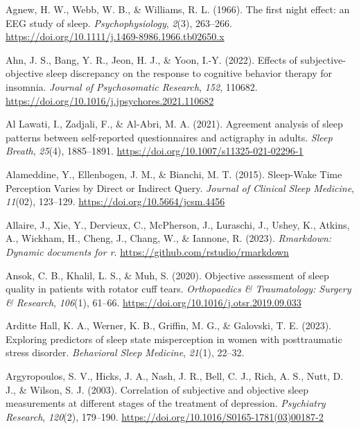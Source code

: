 \documentclass[
]{article}
\newlength{\cslhangindent}
\newenvironment{CSLReferences}[2] %
 {\begin{list}{}{%
  \setlength{\itemindent}{0pt}
  \setlength{\leftmargin}{0pt}
  \setlength{\parsep}{0pt}
  \ifodd #1
   \setlength{\leftmargin}{\cslhangindent}
   \setlength{\itemindent}{-1\cslhangindent}
  \fi
  \setlength{\itemsep}{#2\baselineskip}}}
 {\end{list}}
\begin{document}
\label{refs}
\begin{CSLReferences}{1}{0}
Agnew, H. W., Webb, W. B., \& Williams, R. L. (1966). {The first night effect: an EEG study of sleep.} \emph{Psychophysiology}, \emph{2}(3), 263--266. \url{https://doi.org/10.1111/j.1469-8986.1966.tb02650.x}

Ahn, J. S., Bang, Y. R., Jeon, H. J., \& Yoon, I.-Y. (2022). Effects of subjective-objective sleep discrepancy on the response to cognitive behavior therapy for insomnia. \emph{Journal of Psychosomatic Research}, \emph{152}, 110682. \url{https://doi.org/10.1016/j.jpsychores.2021.110682}

Al Lawati, I., Zadjali, F., \& Al-Abri, M. A. (2021). Agreement analysis of sleep patterns between self-reported questionnaires and actigraphy in adults. \emph{Sleep Breath}, \emph{25}(4), 1885--1891. \url{https://doi.org/10.1007/s11325-021-02296-1}

Alameddine, Y., Ellenbogen, J. M., \& Bianchi, M. T. (2015). Sleep-{Wake} {Time} {Perception} {Varies} by {Direct} or {Indirect} {Query}. \emph{Journal of Clinical Sleep Medicine}, \emph{11}(02), 123--129. \url{https://doi.org/10.5664/jcsm.4456}

Allaire, J., Xie, Y., Dervieux, C., McPherson, J., Luraschi, J., Ushey, K., Atkins, A., Wickham, H., Cheng, J., Chang, W., \& Iannone, R. (2023). \emph{Rmarkdown: Dynamic documents for r}. \url{https://github.com/rstudio/rmarkdown}

Ansok, C. B., Khalil, L. S., \& Muh, S. (2020). Objective assessment of sleep quality in patients with rotator cuff tears. \emph{Orthopaedics \& Traumatology: Surgery \& Research}, \emph{106}(1), 61--66. \url{https://doi.org/10.1016/j.otsr.2019.09.033}

Arditte Hall, K. A., Werner, K. B., Griffin, M. G., \& Galovski, T. E. (2023). Exploring predictors of sleep state misperception in women with posttraumatic stress disorder. \emph{Behavioral Sleep Medicine}, \emph{21}(1), 22--32.

Argyropoulos, S. V., Hicks, J. A., Nash, J. R., Bell, C. J., Rich, A. S., Nutt, D. J., \& Wilson, S. J. (2003). Correlation of subjective and objective sleep measurements at different stages of the treatment of depression. \emph{Psychiatry Research}, \emph{120}(2), 179--190. \url{https://doi.org/10.1016/S0165-1781(03)00187-2}


\end{CSLReferences}
\end{document}

